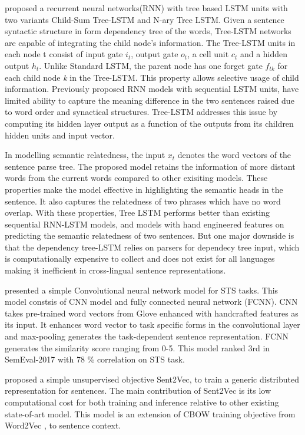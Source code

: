 \documentclass[12pt]{report} %
\begin{document}
\cite{tai2015improved} proposed a recurrent neural networks(RNN) with tree based LSTM units with two variants Child-Sum Tree-LSTM and N-ary Tree LSTM. Given a sentence syntactic structure in form dependency tree of the words, Tree-LSTM networks are capable of integrating the child node's information. The Tree-LSTM units in each node t consist of input gate $i_{t}$, output gate $o_{t}$, a cell unit $c_{t}$ and a hidden output $h_{t}$. Unlike Standard LSTM, the parent node has one forget gate $f_{tk}$ for each child node \textit{k} in the Tree-LSTM. This property allows selective usage of child information. Previously proposed RNN models with sequential LSTM units, have limited ability to capture the meaning difference in the two sentences raised due to word order and synactical structures. Tree-LSTM addresses this issue by computing its hidden layer output as a function of the outputs from its children hidden units and input vector. 

In modelling semantic relatedness, the input $x_{t}$ denotes the word vectors of the sentence parse tree. The proposed model retains the information of more distant words from the current words compared to other exisiting models. These properties make the model effective in highlighting the semantic heads in the sentence. It also captures the relatedness of two phrases which have no word overlap. With these properties, Tree LSTM performs better than existing sequential RNN-LSTM models, and models with hand engineered features on predicting the semantic relatedness of two sentences. But one major downside is that the dependency tree-LSTM relies on parsers for dependecy tree input, which is computationally expensive to collect and does not exist for all languages making it inefficient in cross-lingual sentence representations.



\cite{shao2017hcti} presented a simple Convolutional neural network model for STS tasks. This model constsis of CNN model and fully connected neural network (FCNN). CNN takes pre-trained word vectors from Glove \cite{pennington2014glove} enhanced with handcrafted features as its input. It enhances word vector to task specific forms in the convolutional layer and max-pooling generates the task-dependent sentence representation. FCNN generates the similarity score ranging from 0-5. This model ranked 3rd in SemEval-2017 with 78 \% correlation on STS task. 


\cite{pagliardini2017unsupervised} proposed a simple unsupervised objective Sent2Vec, to train a generic distributed representation for sentences. The main contribution of Sent2Vec is its low computational cost for both training and inference relative to other existing state-of-art model. This model is an extension of CBOW training objective from Word2Vec \citep{mikolov2014word2vec}, to sentence context.
\end{document}
